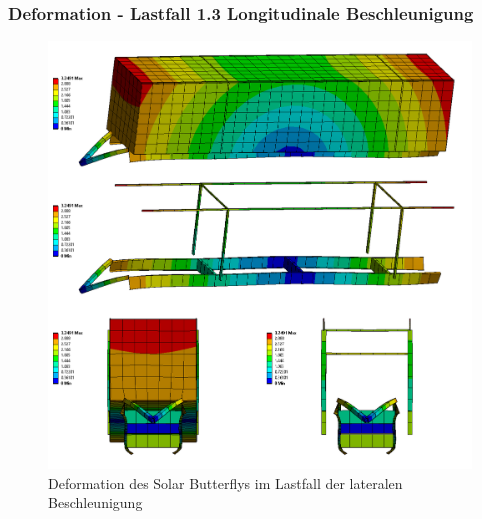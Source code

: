 \subsubsection{Deformation - Lastfall 1.3 Longitudinale Beschleunigung}
\begin{figure}[H]
  \centering
  \includegraphics[width=1\linewidth]{04_figures/FEM 1.3.png}
  \caption{Deformation des Solar Butterflys im Lastfall der lateralen Beschleunigung}
  \label{FEM 1.3}
\end{figure}

